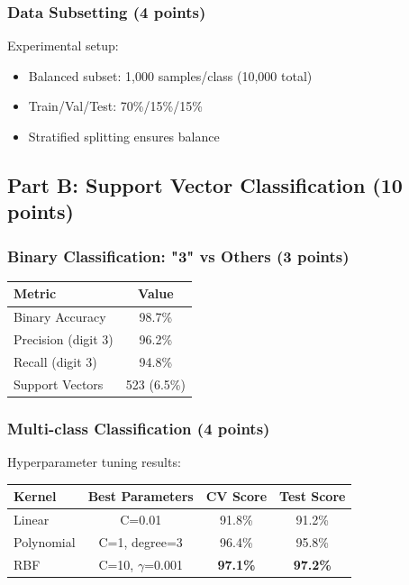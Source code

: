\documentclass[12pt,a4paper]{article}
\theoremstyle{definition}
\begin{document}
\subsubsection{Data Subsetting (4 points)}

Experimental setup:
\begin{itemize}
\item Balanced subset: 1,000 samples/class (10,000 total)
\item Train/Val/Test: 70\%/15\%/15\%
\item Stratified splitting ensures balance
\end{itemize}

\subsection{Part B: Support Vector Classification (10 points)}

\subsubsection{Binary Classification: "3" vs Others (3 points)}

\begin{center}
\begin{tabular}{|l|c|}
\hline
\textbf{Metric} & \textbf{Value} \\
\hline
Binary Accuracy & 98.7\% \\
Precision (digit 3) & 96.2\% \\
Recall (digit 3) & 94.8\% \\
Support Vectors & 523 (6.5\%) \\
\hline
\end{tabular}
\end{center}

\subsubsection{Multi-class Classification (4 points)}

Hyperparameter tuning results:
\begin{center}
\begin{tabular}{|l|c|c|c|}
\hline
\textbf{Kernel} & \textbf{Best Parameters} & \textbf{CV Score} & \textbf{Test Score} \\
\hline
Linear & C=0.01 & 91.8\% & 91.2\% \\
Polynomial & C=1, degree=3 & 96.4\% & 95.8\% \\
RBF & C=10, $\gamma$=0.001 & \textbf{97.1\%} & \textbf{97.2\%} \\
\hline
\end{tabular}
\end{center}
\end{document}
